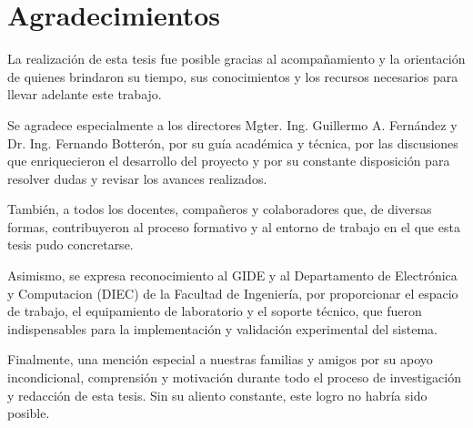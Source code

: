 
\chapter*{Agradecimientos} 

La realización de esta tesis fue posible gracias al acompañamiento y la orientación de quienes brindaron su tiempo, sus conocimientos y los recursos necesarios para llevar adelante este trabajo.

Se agradece especialmente a los directores Mgter. Ing. Guillermo A. Fernández y Dr. Ing. Fernando Botterón, por su guía académica y técnica, por las discusiones que enriquecieron el desarrollo del proyecto y por su constante disposición para resolver dudas y revisar los avances realizados.

También,  a todos los docentes, compañeros y colaboradores que, de diversas formas, contribuyeron al proceso formativo y al entorno de trabajo en el que esta tesis pudo concretarse.

Asimismo, se expresa reconocimiento al GIDE y al Departamento de Electrónica y Computacion (DIEC) de la Facultad de Ingeniería, por proporcionar el espacio de trabajo, el equipamiento de laboratorio y el soporte técnico, que fueron indispensables para la implementación y validación experimental del sistema.

Finalmente, una mención especial a nuestras familias y amigos por su apoyo incondicional, comprensión y motivación durante todo el proceso de investigación y redacción de esta tesis. Sin su aliento constante, este logro no habría sido posible.